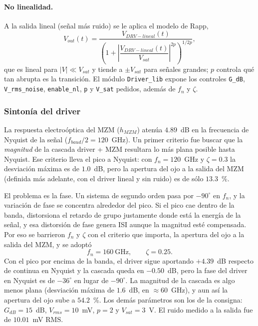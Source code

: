 \paragraph{No linealidad.}
A la salida lineal (señal más ruido) se le aplica el modelo de Rapp,
%
\begin{equation}
V_{out}(t) = \frac{V_{DRV-lineal}(t)}
{\left(1 + \left|\dfrac{V_{DRV-lineal}(t)}{V_{sat}}\right|^{2p}\right)^{1/2p}},
\end{equation}
%
que es lineal para $|V| \ll V_{sat}$ y tiende a $\pm V_{sat}$ para señales
grandes; $p$ controla qué tan abrupta es la transición. El módulo
\texttt{Driver\_lib} expone los controles \texttt{G\_dB},
\texttt{V\_rms\_noise}, \texttt{enable\_nl}, \texttt{p} y \texttt{V\_sat}
pedidos, además de $f_n$ y $\zeta$.

\subsubsection*{Sintonía del driver}

La respuesta electroóptica del MZM ($h_{MZM}$) atenúa $4.89$~dB en la
frecuencia de Nyquist de la señal ($f_{baud}/2 = 120$~GHz). Un primer
criterio fue buscar que la \emph{magnitud} de la cascada driver + MZM
resultara lo más plana posible hasta Nyquist. Ese criterio lleva el pico a
Nyquist: con $f_n = 120$~GHz y $\zeta = 0.3$ la desviación máxima es de
$1.0$~dB, pero la apertura del ojo a la salida del MZM (definida más
adelante, con el driver lineal y sin ruido) es de sólo $13.3$~\%.

El problema es la fase. Un sistema de segundo orden pasa por $-90^\circ$
en $f_n$, y la variación de fase se concentra alrededor del pico. Si el pico
cae dentro de la banda, distorsiona el retardo de grupo justamente donde
está la energía de la señal, y esa distorsión de fase genera ISI aunque la
magnitud esté compensada. Por eso se barrieron $f_n$ y $\zeta$ con el
criterio que importa, la apertura del ojo a la salida del MZM, y se
adoptó
%
\begin{equation}
f_n = 160~\text{GHz}, \qquad \zeta = 0.25.
\end{equation}
%
Con el pico por encima de la banda, el driver sigue aportando $+4.39$~dB
respecto de continua en Nyquist y la cascada queda en $-0.50$~dB, pero la
fase del driver en Nyquist es de $-36^\circ$ en lugar de $-90^\circ$. La
magnitud de la cascada es algo menos plana (desviación máxima de
$1.6$~dB, en $\approx 60$~GHz), y aun así la apertura del ojo sube a
$54.2$~\%. Los demás parámetros son los de la consigna:
$G_{dB} = 15$~dB, $V_{rms} = 10$~mV, $p = 2$ y $V_{sat} = 3$~V. El ruido
medido a la salida fue de $10.01$~mV RMS.


